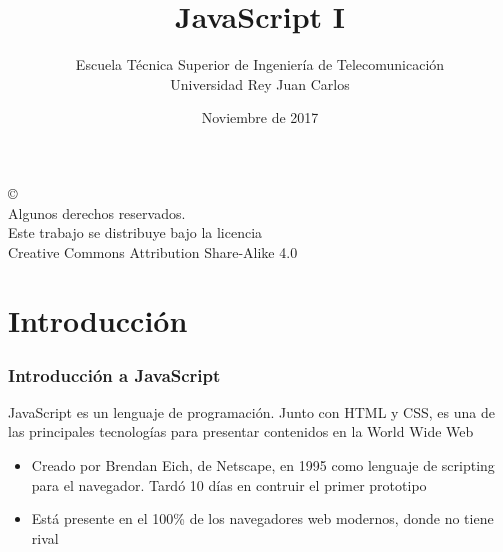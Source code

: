 \documentclass[ucs]{beamer}
\begin{document}
\title[JavaScript]{JavaScript I}
\author[GSyC]{Escuela Técnica Superior de Ingeniería de Telecomunicación\\
Universidad Rey Juan Carlos}
\date[2017]{Noviembre de 2017}

\begin{frame}
  \titlepage
\end{frame}


\begin{frame}[b]
\begin{flushright}
{\tiny
\copyright \insertshortdate~\insertshortauthor \\
  Algunos derechos reservados. \\
  Este trabajo se distribuye bajo la licencia \\
  Creative Commons Attribution Share-Alike 4.0
}
\end{flushright}
\end{frame}




%

\section{Introducción}



\begin{frame}
\frametitle{Introducción a JavaScript}

JavaScript es un lenguaje de programación. Junto con HTML y CSS, es una
de las principales tecnologías para presentar contenidos en la World Wide Web

\begin{itemize}
\item
Creado por Brendan Eich, de Netscape, en 1995 como lenguaje de scripting para el navegador. Tardó 10
días en contruir el primer prototipo

\item
Está presente en el 100\% de los navegadores web modernos, donde no tiene
rival
\end{itemize}

\end{frame}
\end{document}
